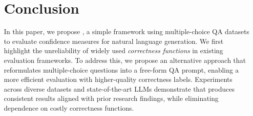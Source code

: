 \section{Conclusion}\label{sec:conclusion}

In this paper, we propose \uqeval, a simple framework using multiple-choice QA datasets to evaluate confidence measures for natural language generation.
We first highlight the unreliability of widely used \textit{correctness functions} in existing evaluation frameworks.
To address this, we propose an alternative approach that reformulates multiple-choice questions into a free-form QA prompt, enabling a more efficient evaluation with higher-quality correctness labels. 
Experiments across diverse datasets and state-of-the-art LLMs demonstrate that \uqeval produces consistent results aligned with prior research findings, while eliminating dependence on costly correctness functions.






